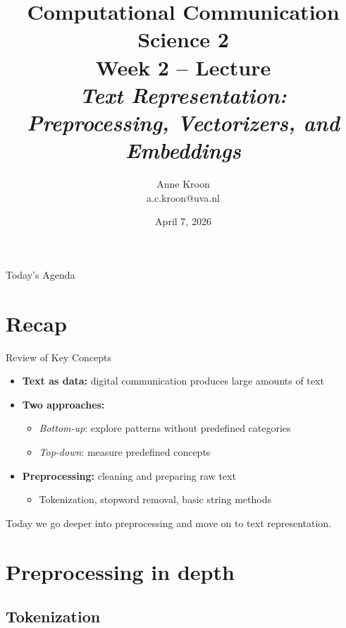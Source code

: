 \documentclass[handout]{beamer}
\title[CCS2]{\textbf{Computational Communication Science 2} \\
Week 2 -- Lecture\\
\emph{Text Representation: Preprocessing, Vectorizers, and Embeddings}}
\author[Anne Kroon]{Anne Kroon \\ \footnotesize{a.c.kroon@uva.nl}}
\date{April 7, 2026}
\institute[Digital Society Minor]{Digital Society Minor, University of Amsterdam}
\begin{document}
\begin{frame}{}
    \titlepage
\end{frame}

\begin{frame}{Today's Agenda}
    \begin{tiny}\tableofcontents\end{tiny}
\end{frame}

\section{Recap}

\begin{frame}{Review of Key Concepts}
    \begin{itemize}
        \item \textbf{Text as data:} digital communication produces large amounts of text
        \item \textbf{Two approaches:}
        \begin{itemize}
            \item \emph{Bottom-up}: explore patterns without predefined categories
            \item \emph{Top-down}: measure predefined concepts
        \end{itemize}
        \item \textbf{Preprocessing:} cleaning and preparing raw text
        \begin{itemize}
            \item Tokenization, stopword removal, basic string methods
        \end{itemize}
    \end{itemize}
    \vspace{0.3cm}
    Today we go deeper into preprocessing and move on to text representation.
\end{frame}

\section{Preprocessing in depth}

\subsection{Tokenization}
\end{document}
